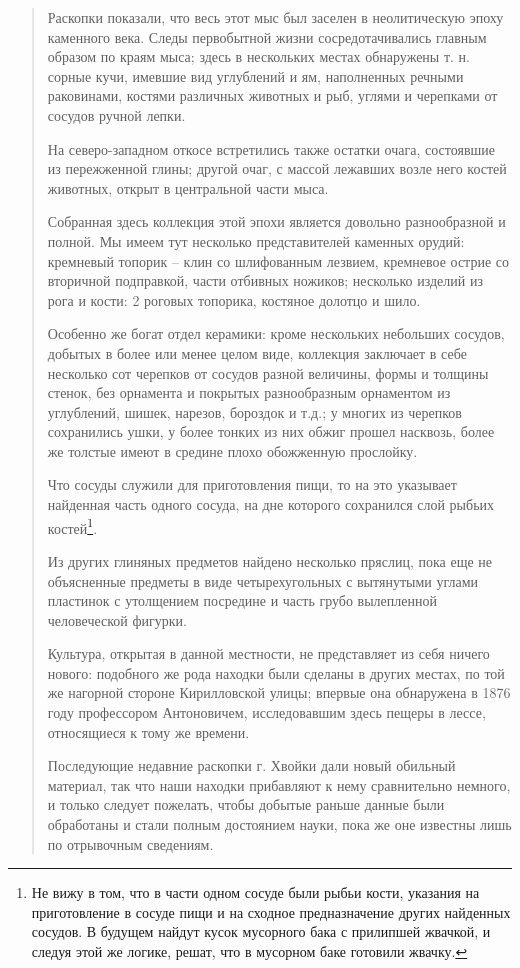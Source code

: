 \begin{quotation}
Раскопки показали, что весь этот мыс был заселен в неолитическую эпоху каменного века. Следы первобытной жизни сосредотачивались главным образом по краям мыса; здесь в нескольких местах обнаружены т. н. сорные кучи, имевшие вид углублений и ям, наполненных речными раковинами, костями различных животных и рыб, углями и черепками от сосудов ручной лепки.

На северо-западном откосе встретились также остатки очага, состоявшие из пережженной глины; другой очаг, с массой лежавших возле него костей животных, открыт в центральной части мыса.

Собранная здесь коллекция этой эпохи является довольно разнообразной и полной. Мы имеем тут несколько представителей каменных орудий: кремневый топорик – клин со шлифованным лезвием, кремневое острие со вторичной подправкой, части отбивных ножиков; несколько изделий из рога и кости: 2 роговых топорика, костяное долотцо и шило.

Особенно же богат отдел керамики: кроме нескольких небольших сосудов, добытых в более или менее целом виде, коллекция заключает в себе несколько сот черепков от сосудов разной величины, формы и толщины стенок, без орнамента и покрытых разнообразным орнаментом из углублений, шишек, нарезов, бороздок и т.д.; у многих из черепков сохранились ушки, у более тонких из них обжиг прошел насквозь, более же толстые имеют в средине плохо обожженную прослойку.

Что сосуды служили для приготовления пищи, то на это указывает найденная часть одного сосуда, на дне которого сохранился слой рыбьих костей\footnote{Не вижу в том, что в части одном сосуде были рыбьи кости, указания на приготовление в сосуде пищи и на сходное предназначение других найденных сосудов. В будущем найдут кусок мусорного бака с прилипшей жвачкой, и следуя этой же логике, решат, что в мусорном баке готовили жвачку.}.

Из других глиняных предметов найдено нес\-колько пряслиц, пока еще не объясненные предметы в виде четырехугольных с вытянутыми углами пластинок с утолщением посредине и часть грубо вылепленной человеческой фигурки.

Культура, открытая в данной местности, не представляет из себя ничего нового: подобного же рода находки были сделаны в других местах, по той же нагорной стороне Кирилловской улицы; впервые она обнаружена в 1876 году профессором Антоновичем, исследовавшим здесь пещеры в лессе, относящиеся к тому же времени.

Последующие недавние раскопки г. Хвойки дали новый обильный материал, так что наши находки прибавляют к нему сравнительно немного, и только следует пожелать, чтобы добытые раньше данные были обработаны и стали полным достоянием науки, пока же оне известны лишь по отрывочным сведениям.


\end{quotation}
